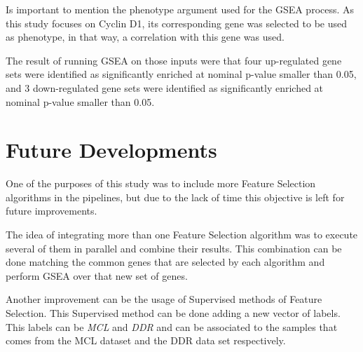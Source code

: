 Is important to mention the phenotype argument used for the GSEA process.
As this study focuses on Cyclin D1, its corresponding gene was selected to be used as phenotype, in that way, a correlation with this gene was used.

The result of running GSEA on those inputs were that four up-regulated gene sets were identified as significantly enriched at nominal p-value smaller than 0.05, and 3 down-regulated gene sets were identified as significantly enriched at nominal p-value smaller than 0.05.

\section{Future Developments}

One of the purposes of this study was to include more Feature Selection algorithms in the pipelines, but due to the lack of time this objective is left for future improvements.

The idea of integrating more than one Feature Selection algorithm was to execute several of them in parallel and combine their results. This combination can be done matching the common genes that are selected by each algorithm and perform GSEA over that new set of genes.

Another improvement can be the usage of Supervised methods of Feature Selection. This Supervised method can be done adding a new vector of labels. This labels can be \textit{MCL} and \textit{DDR} and can be associated to the samples that comes from the MCL dataset and the DDR data set respectively.